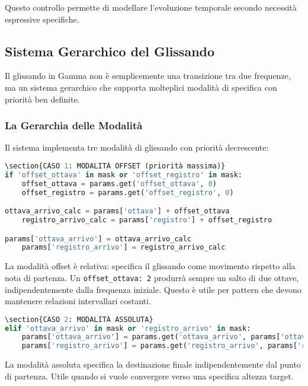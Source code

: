 Questo controllo permette di modellare l'evoluzione temporale secondo necessità espressive specifiche.
\subsection{Sistema Gerarchico del Glissando}
Il glissando in Gamma non è semplicemente una transizione tra due frequenze, ma un sistema gerarchico che supporta molteplici modalità di specifica con priorità ben definite.
\subsubsection{La Gerarchia delle Modalità}
Il sistema implementa tre modalità di glissando con priorità decrescente:

\begin{lstlisting}[language=Python]
\section{CASO 1: MODALITÀ OFFSET (priorità massima)}
if 'offset_ottava' in mask or 'offset_registro' in mask:
    offset_ottava = params.get('offset_ottava', 0)
    offset_registro = params.get('offset_registro', 0)

ottava_arrivo_calc = params['ottava'] + offset_ottava
    registro_arrivo_calc = params['registro'] + offset_registro

params['ottava_arrivo'] = ottava_arrivo_calc
    params['registro_arrivo'] = registro_arrivo_calc
\end{lstlisting}

La modalità offset è relativa: specifica il glissando come movimento rispetto alla nota di partenza. Un \texttt{offset\_ottava: 2} produrrà sempre un salto di due ottave, indipendentemente dalla frequenza iniziale. Questo è utile per pattern che devono mantenere relazioni intervallari costanti.

\begin{lstlisting}[language=Python]
\section{CASO 2: MODALITÀ ASSOLUTA}
elif 'ottava_arrivo' in mask or 'registro_arrivo' in mask:
    params['ottava_arrivo'] = params.get('ottava_arrivo', params['ottava'])
    params['registro_arrivo'] = params.get('registro_arrivo', params['registro'])
\end{lstlisting}

La modalità assoluta specifica la destinazione finale indipendentemente dal punto di partenza. Utile quando si vuole convergere verso una specifica altezza target.

